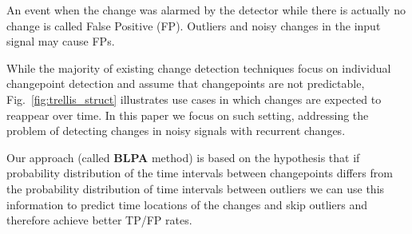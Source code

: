 An event when the change was alarmed by the detector while there is actually no change is called False Positive (FP).
Outliers and noisy changes in the input signal may cause FPs. %
%
%

While the majority of existing change detection techniques focus on individual changepoint detection and assume that changepoints are not predictable, Fig.~\ref{fig:trellis_struct} illustrates use cases in which changes are expected to reappear over time.
In this paper we focus on such setting, addressing the problem of detecting changes in noisy signals with recurrent changes.

Our approach (called \textbf{BLPA} method) is based on the hypothesis that if probability distribution of the time intervals between changepoints differs from the probability distribution of time intervals between outliers we can use this information to predict time locations of the changes and skip outliers and therefore achieve better TP/FP rates.

